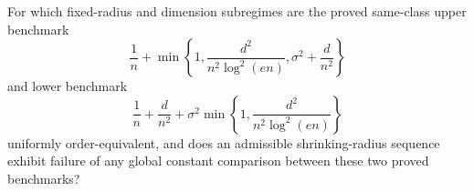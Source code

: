 For which fixed-radius and dimension subregimes are the proved same-class upper benchmark
\[
 \frac1n+\min\left\{1,\frac{d^2}{n^2\log^2(en)},\sigma^2+\frac d{n^2}\right\}
\]
and lower benchmark
\[
 \frac1n+\frac d{n^2}+\sigma^2\min\left\{1,\frac{d^2}{n^2\log^2(en)}\right\}
\]
uniformly order-equivalent, and does an admissible shrinking-radius sequence exhibit failure of any global constant comparison between these two proved benchmarks?